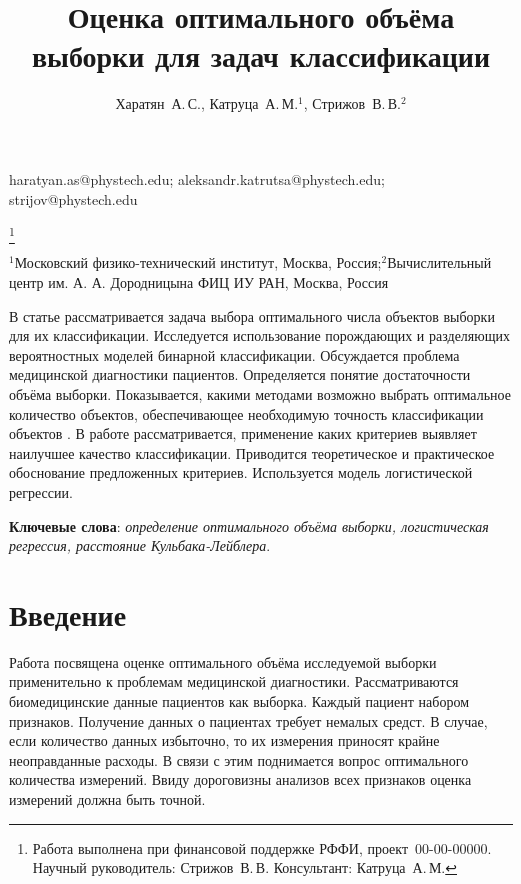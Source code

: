 \documentclass[12pt,twoside]{article}
\begin{document}
\title
    {Оценка оптимального объёма выборки для задач классификации}
\author
    {Харатян~А.\,С., Катруца~А.\,М.$^1$, Стрижов~В.\,В.$^2$} %
\email
	{haratyan.as@phystech.edu; aleksandr.katrutsa@phystech.edu; strijov@phystech.edu}

\thanks
    {Работа выполнена при финансовой поддержке РФФИ, проект \No\,00-00-00000.
     Научный руководитель:  Стрижов~В.\,В.
     Консультант:  Катруца~А.\,М.}

\organization
    {$^1$Московский физико-технический институт, Москва, Россия;$^2$Вычислительный центр им. А. А. Дородницына ФИЦ ИУ РАН, Москва, Россия}
    
\abstract
	{В статье рассматривается задача выбора оптимального числа объектов выборки для их классификации. Исследуется использование порождающих и разделяющих вероятностных моделей бинарной классификации. Обсуждается проблема медицинской диагностики пациентов. Определяется понятие достаточности объёма выборки. Показывается, какими методами возможно выбрать оптимальное количество объектов, обеспечивающее необходимую точность классификации объектов . В работе рассматривается, применение каких критериев выявляет наилучшее качество классификации. Приводится теоретическое и практическое обоснование предложенных критериев. Используется модель логистической регрессии.

\bigskip
\noindent
\textbf{Ключевые слова}: \emph {определение оптимального объёма выборки, логистическая регрессия, расстояние Кульбака-Лейблера}.

}


\maketitle


\section{Введение}

Работа посвящена оценке оптимального объёма исследуемой выборки применительно к проблемам медицинской диагностики. Рассматриваются биомедицинские данные пациентов как выборка. Каждый пациент набором признаков. 
Получение данных о пациентах требует немалых средст. В случае, если количество данных избыточно, то их измерения приносят крайне неоправданные расходы. В связи с этим поднимается вопрос оптимального количества измерений.
Ввиду дороговизны анализов всех признаков оценка измерений должна быть точной. 
\end{document}
